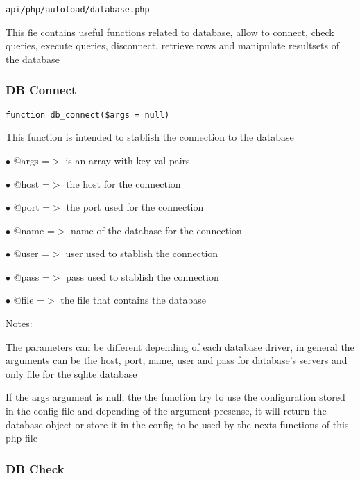 \documentclass[a4paper]{article}
\begin{document}
\begin{lstlisting}
api/php/autoload/database.php
\end{lstlisting}

This fie contains useful functions related to database, allow to connect, check queries, execute
queries, disconnect, retrieve rows and manipulate resultsets of the database

\hypertarget{toc84}{}
\subsubsection{DB Connect}

\begin{lstlisting}
function db_connect($args = null)
\end{lstlisting}

This function is intended to stablish the connection to the database

\begin{compactitem}
\item[\color{myblue}$\bullet$] @args =$>$ is an array with key val pairs
\item[\color{myblue}$\bullet$] @host =$>$ the host for the connection
\item[\color{myblue}$\bullet$] @port =$>$ the port used for the connection
\item[\color{myblue}$\bullet$] @name =$>$ name of the database for the connection
\item[\color{myblue}$\bullet$] @user =$>$ user used to stablish the connection
\item[\color{myblue}$\bullet$] @pass =$>$ pass used to stablish the connection
\item[\color{myblue}$\bullet$] @file =$>$ the file that contains the database
\end{compactitem}

Notes:

The parameters can be different depending of each database driver, in general the arguments can
be the host, port, name, user and pass for database's servers and only file for the sqlite database

If the args argument is null, the the function try to use the configuration stored in the config file
and depending of the argument presense, it will return the database object or store it in the config
to be used by the nexts functions of this php file

\hypertarget{toc85}{}
\subsubsection{DB Check}
\end{document}

